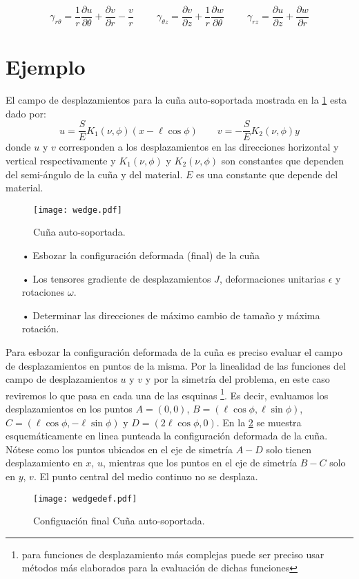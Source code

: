 \documentclass[../notas medios.tex]{subfiles}
\begin{document}
\begin{equation*}	
	\gamma_{r \theta} = \dfrac{1}{r} \dfrac{\partial u}{\partial \theta} + \dfrac{\partial v}{\partial r} - \dfrac{v}{r} 
	\hspace{1cm}
	\gamma_{\theta z} = \dfrac{\partial v}{\partial z} + \dfrac{1}{r} \dfrac{\partial w}{\partial \theta} 
	\hspace{1cm}
	\gamma_{rz}	 = \dfrac{\partial u}{\partial z} + \dfrac{\partial w}{\partial r}
\end{equation*}

\section*{Ejemplo}

El campo de desplazamientos para la cuña auto-soportada mostrada en la \cref{wedge} esta dado por:
\begin{equation*}	
	u = \frac{S}{E} K_1 (\nu ,\phi) (x - \ell \cos\phi)\qquad
	v =  - \frac{S}{E} K_2 (\nu ,\phi) y
\end{equation*}
donde $u$ y $v$ corresponden a los desplazamientos en las direcciones horizontal y vertical respectivamente y ${K_1}\left( {\nu ,\phi } \right)$ y ${K_2}\left( {\nu ,\phi } \right)$ son constantes que dependen del semi-ángulo de la cuña y del material. $E$ es una constante que depende del material. 
\begin{figure}[H]
\centering
	\texttt{[image: wedge.pdf]}
	\caption{Cuña auto-soportada.}
	\label{wedge}
\end{figure}

\begin{itemize}
\item[•] Esbozar la configuración deformada (final) de la cuña
\item[•] Los tensores gradiente de desplazamientos $J$, deformaciones unitarias $\epsilon$ y rotaciones $\omega$.
\item[•] Determinar las direcciones de máximo cambio de tamaño y máxima rotación.
\end{itemize}

Para esbozar la configuración deformada de la cuña es preciso evaluar el campo de desplazamientos en puntos de la misma. Por la linealidad de las funciones del campo de desplazamientos $u$ y $v$ y por la simetría del problema, en este caso reviremos lo que pasa en cada una de las esquinas \footnote{para funciones de desplazamiento más complejas puede ser preciso usar métodos más elaborados para la evaluación de dichas funciones}. Es decir, evaluamos los desplazamientos en los puntos $A = (0,0)$,  $B = (\ell \cos\phi, \ell \sin\phi)$, $C = (\ell \cos\phi, -\ell \sin\phi)$ y $D = (2\ell \cos\phi,0)$. En la \cref{wedgedef} se muestra esquemáticamente en linea punteada la configuración deformada de la cuña. Nótese  como los puntos ubicados en el eje de simetría $A-D$ solo tienen desplazamiento en $x$, $u$, mientras que los puntos en el eje de simetría $B-C$ solo en $y$, $v$. El punto central del medio continuo no se desplaza. 
\begin{figure}[H]
\centering
	\texttt{[image: wedgedef.pdf]}
	\caption{Configuación final Cuña auto-soportada.}
	\label{wedgedef}
\end{figure}
\end{document}
